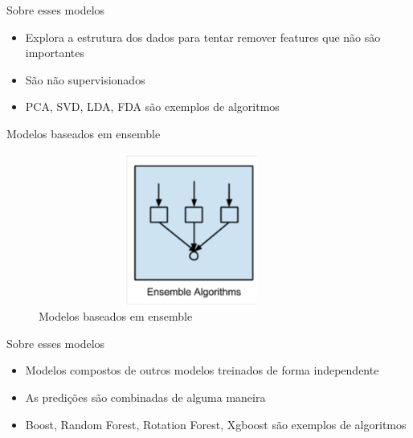 \begin{frame}	
	\begin{block}{Sobre esses modelos}	
		\begin{itemize}
			\item Explora a estrutura dos dados para tentar remover features que não são importantes 
			\item São não supervisionados
			\item PCA, SVD, LDA, FDA são exemplos de algoritmos
		\end{itemize}
	\end{block}
\end{frame}


\begin{frame}	
	\begin{block}{Modelos baseados em ensemble}	
		\begin{figure}[!htb]
			\centering	  				
			\includegraphics[height=5cm, width = 10cm]{./pic/ensemble.png}
			\caption{Modelos baseados em ensemble}
			\label{fig_modelos}
		\end{figure}
	\end{block}
\end{frame}


\begin{frame}	
	\begin{block}{Sobre esses modelos}	
		\begin{itemize}
			\item Modelos compostos de outros modelos treinados de forma independente
			\item As predições são combinadas de alguma maneira
			\item Boost, Random Forest, Rotation Forest, Xgboost  são exemplos de algoritmos
		\end{itemize}
	\end{block}
\end{frame}





